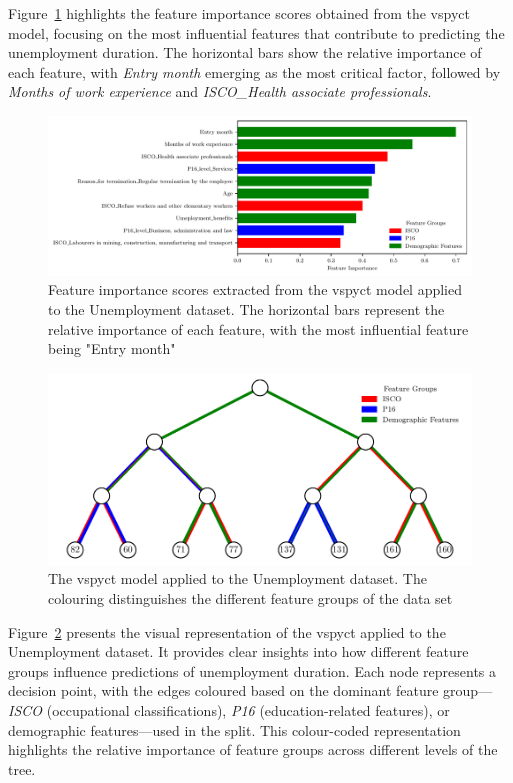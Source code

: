 \documentclass[3p,review,authoryear]{elsarticle}
\begin{document}
Figure~\ref{fig:feature_importance} highlights the feature importance scores obtained from the \gls{vspyct} model, focusing on the most influential features that contribute to predicting the unemployment duration.
The horizontal bars show the relative importance of each feature, with \textit{Entry month} emerging as the most critical factor, followed by \textit{Months of work experience} and \textit{ISCO\_Health associate professionals}.

\begin{figure}[h!]
    \centering
    \includegraphics[width=1.0\textwidth]{feature_importance_colored.pdf}
    \caption{Feature importance scores extracted from the \gls{vspyct} model applied to the Unemployment dataset. The horizontal bars represent the relative importance of each feature, with the most influential feature being "Entry month"}
    \label{fig:feature_importance}
\end{figure}

\begin{figure}[h!]
    \centering
    \includegraphics{hecat_tree_new_temp.pdf}
    \caption{The \gls{vspyct} model applied to the Unemployment dataset. The colouring distinguishes the different feature groups of the data set}
    \label{fig:inter_tree}
\end{figure}


Figure~\ref{fig:inter_tree} presents the visual representation of the \gls{vspyct} applied to the Unemployment dataset.
It provides clear insights into how different feature groups influence predictions of unemployment duration.
Each node represents a decision point, with the edges coloured based on the dominant feature group—\textit{ISCO} (occupational classifications), \textit{P16} (education-related features), or demographic features—used in the split.
This colour-coded representation highlights the relative importance of feature groups across different levels of the tree.
\end{document}
